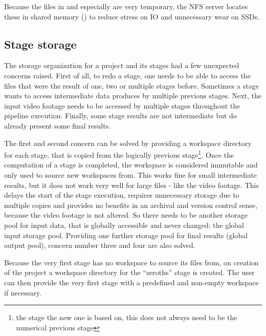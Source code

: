 Because the files in  and especially  are very temporary, the NFS server locates these in shared memory () to reduce stress on IO and unnecessary wear on SSDs.

\subsection{Stage storage}
\label{stage:workspace}

The storage organization for a project and its stages had a few unexpected concerns raised.
First of all, to redo a stage, one needs to be able to access the files that were the result of one, two or multiple stages before.
Sometimes a stage wants to access intermediate data produces by multiple previous stages.
Next, the input video footage needs to be accessed by multiple stages throughout the pipeline execution.
Finally, some stage results are not intermediate but do already present some final results.

The first and second concern can be solved by providing a workspace directory for each stage, that is copied from the logically previous stage\footnote{the stage the new one is based on, this does not always need to be the numerical previous stage}.
Once the computation of a stage is completed, the workspace is considered immutable and only used to source new workspaces from.
This works fine for small intermediate results, but it does not work very well for large files - like the video footage.
This delays the start of the stage execution, requires unnecessary storage due to multiple copies and provides no benefits in an archival and version control sense, because the video footage is not altered.
So there needs to be another storage pool for input data, that is globally accessible and never changed: the global input storage pool.
Providing one further storage pool for final results (global output pool), concern number three and four are also solved.

Because the very first stage has no workspace to source its files from, on creation of the project a workspace directory for the \enquote{zeroths} stage is created.
The user can then provide the very first stage with a predefined and non-empty workspace if necessary.

